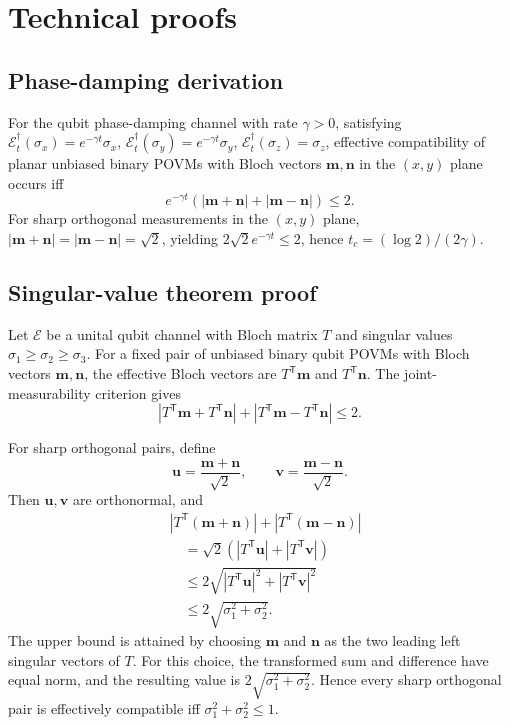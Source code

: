 \documentclass[
aps,pra,twocolumn,10pt,
superscriptaddress,longbibliography,floatfix
]{revtex4-2}
\begin{document}
\section{Technical proofs}
\label{app:technical}

\subsection{Phase-damping derivation}

For the qubit phase-damping channel with rate $\gamma>0$, satisfying $\mathcal E_t^\dagger(\sigma_x)=e^{-\gamma t}\sigma_x$, $\mathcal E_t^\dagger(\sigma_y)=e^{-\gamma t}\sigma_y$, $\mathcal E_t^\dagger(\sigma_z)=\sigma_z$, effective compatibility of planar unbiased binary POVMs with Bloch vectors $\mathbf m,\mathbf n$ in the $(x,y)$ plane occurs iff
\[
e^{-\gamma t}(|\mathbf m+\mathbf n|+|\mathbf m-\mathbf n|)\le2.
\]
For sharp orthogonal measurements in the $(x,y)$ plane, $|\mathbf m+\mathbf n|=|\mathbf m-\mathbf n|=\sqrt2$, yielding $2\sqrt2 e^{-\gamma t}\le2$, hence $t_c=(\log 2)/(2\gamma)$.

\subsection{Singular-value theorem proof}

Let $\mathcal E$ be a unital qubit channel with Bloch matrix $T$ and singular values $\sigma_1\ge\sigma_2\ge\sigma_3$. For a fixed pair of unbiased binary qubit POVMs with Bloch vectors $\mathbf m,\mathbf n$, the effective Bloch vectors are $T^{\mathsf T}\mathbf m$ and $T^{\mathsf T}\mathbf n$. The joint-measurability criterion gives
\[
|T^{\mathsf T}\mathbf m+T^{\mathsf T}\mathbf n|+|T^{\mathsf T}\mathbf m-T^{\mathsf T}\mathbf n|\le2.
\]

For sharp orthogonal pairs, define
\[
\mathbf u=\frac{\mathbf m+\mathbf n}{\sqrt2},\qquad
\mathbf v=\frac{\mathbf m-\mathbf n}{\sqrt2}.
\]
Then $\mathbf u,\mathbf v$ are orthonormal, and
\begin{align*}
&|T^{\mathsf T}(\mathbf m+\mathbf n)|
 +|T^{\mathsf T}(\mathbf m-\mathbf n)|\\
&\quad=
\sqrt2\left(
|T^{\mathsf T}\mathbf u|
+
|T^{\mathsf T}\mathbf v|
\right)\\
&\quad\le
2\sqrt{
|T^{\mathsf T}\mathbf u|^2
+
|T^{\mathsf T}\mathbf v|^2
}\\
&\quad\le
2\sqrt{\sigma_1^2+\sigma_2^2}.
\end{align*}
The upper bound is attained by choosing
$\mathbf m$ and $\mathbf n$ as the two leading left singular
vectors of $T$. For this choice, the transformed sum and
difference have equal norm, and the resulting value is
$2\sqrt{\sigma_1^2+\sigma_2^2}$.
Hence every sharp orthogonal pair is effectively compatible iff $\sigma_1^2+\sigma_2^2\le1$.


\end{document}
